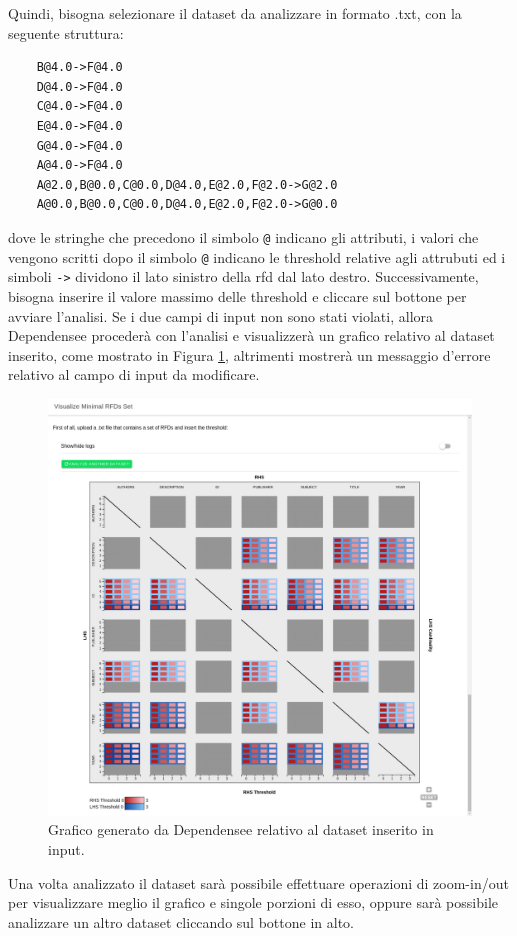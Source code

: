 Quindi, bisogna selezionare il dataset da analizzare in formato .txt, con la seguente struttura:
\begin{verbatim}
    B@4.0->F@4.0
    D@4.0->F@4.0
    C@4.0->F@4.0
    E@4.0->F@4.0
    G@4.0->F@4.0
    A@4.0->F@4.0
    A@2.0,B@0.0,C@0.0,D@4.0,E@2.0,F@2.0->G@2.0
    A@0.0,B@0.0,C@0.0,D@4.0,E@2.0,F@2.0->G@0.0
\end{verbatim}
dove le stringhe che precedono il simbolo \texttt{@} indicano gli attributi, i valori che vengono scritti dopo il simbolo \texttt{@} indicano le threshold relative agli attrubuti ed i simboli \texttt{->} dividono il lato sinistro della \acrshort{rfd} dal lato destro. Successivamente, bisogna inserire il valore massimo delle threshold e cliccare sul bottone per avviare l'analisi. Se i due campi di input non sono stati violati, allora Dependensee proceder\`{a} con l'analisi e visualizzer\`{a} un grafico relativo al dataset inserito, come mostrato in Figura \ref{fig:dependensee_dataset_analyzed}, altrimenti mostrer\`{a} un messaggio d'errore relativo al campo di input da modificare.
\begin{figure}[ht]
    \centering
    \includegraphics[width=\linewidth]{capitoli/figure/dependensee_analyzed_screen}
    \caption{Grafico generato da Dependensee relativo al dataset inserito in input.}
    \label{fig:dependensee_dataset_analyzed}
\end{figure}
Una volta analizzato il dataset sar\`{a} possibile effettuare operazioni di zoom-in/out per visualizzare meglio il grafico e singole porzioni di esso, oppure sar\`{a} possibile analizzare un altro dataset cliccando sul bottone in alto.

